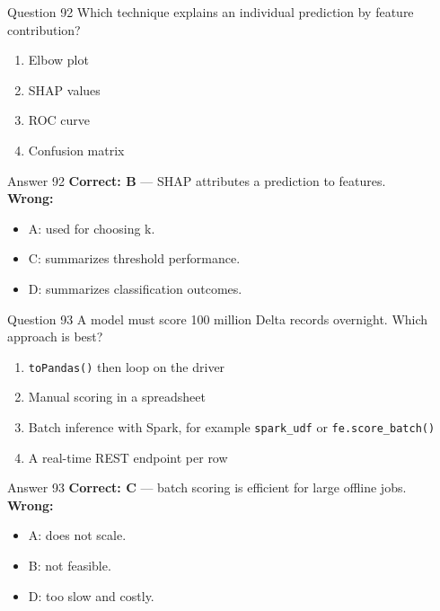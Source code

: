 \documentclass[aspectratio=169,11pt]{beamer}
\begin{document}
	\begin{frame}{Question 92}
		Which technique explains an individual prediction by feature contribution?
		\begin{enumerate}[label=\Alph*.]
			\item Elbow plot
			\item SHAP values
			\item ROC curve
			\item Confusion matrix
		\end{enumerate}
	\end{frame}
	\begin{frame}{Answer 92}
		\textbf{Correct: B} --- SHAP attributes a prediction to features.\\
		\vspace{0.5em}
		\textbf{Wrong:}
		\begin{itemize}
			\item A: used for choosing k.
			\item C: summarizes threshold performance.
			\item D: summarizes classification outcomes.
		\end{itemize}
	\end{frame}
	
	\begin{frame}{Question 93}
		A model must score 100 million Delta records overnight. Which approach is best?
		\begin{enumerate}[label=\Alph*.]
			\item \texttt{toPandas()} then loop on the driver
			\item Manual scoring in a spreadsheet
			\item Batch inference with Spark, for example \texttt{spark\_udf} or \texttt{fe.score\_batch()}
			\item A real-time REST endpoint per row
		\end{enumerate}
	\end{frame}
	\begin{frame}{Answer 93}
		\textbf{Correct: C} --- batch scoring is efficient for large offline jobs.\\
		\vspace{0.5em}
		\textbf{Wrong:}
		\begin{itemize}
			\item A: does not scale.
			\item B: not feasible.
			\item D: too slow and costly.
		\end{itemize}
	\end{frame}
	
\end{document}
